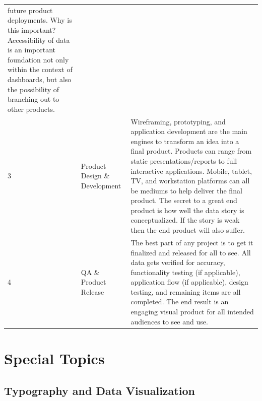 \documentclass[]{book}
\begin{document}
\begin{longtable}[]{@{}lll@{}}
\begin{minipage}[t]{0.76\columnwidth}
future product deployments. Why is this important? Accessibility of data
is an important foundation not only within the context of dashboards,
but also the possibility of branching out to other products.\strut
\end{minipage}\tabularnewline
\begin{minipage}[t]{0.04\columnwidth}\raggedright\strut
3\strut
\end{minipage} & \begin{minipage}[t]{0.11\columnwidth}\raggedright\strut
Product Design \& Development\strut
\end{minipage} & \begin{minipage}[t]{0.76\columnwidth}\raggedright\strut
Wireframing, prototyping, and application development are the main
engines to transform an idea into a final product. Products can range
from static presentations/reports to full interactive applications.
Mobile, tablet, TV, and workstation platforms can all be mediums to help
deliver the final product. The secret to a great end product is how well
the data story is conceptualized. If the story is weak then the end
product will also suffer.\strut
\end{minipage}\tabularnewline
\begin{minipage}[t]{0.04\columnwidth}\raggedright\strut
4\strut
\end{minipage} & \begin{minipage}[t]{0.11\columnwidth}\raggedright\strut
QA \& Product Release\strut
\end{minipage} & \begin{minipage}[t]{0.76\columnwidth}\raggedright\strut
The best part of any project is to get it finalized and released for all
to see. All data gets verified for accuracy, functionality testing (if
applicable), application flow (if applicable), design testing, and
remaining items are all completed. The end result is an engaging visual
product for all intended audiences to see and use.\strut
\end{minipage}\tabularnewline
\bottomrule
\end{longtable}

\section{Special Topics}\label{special-topics-1}

\subsection{Typography and Data
Visualization}\label{typography-and-data-visualization}
\end{document}
